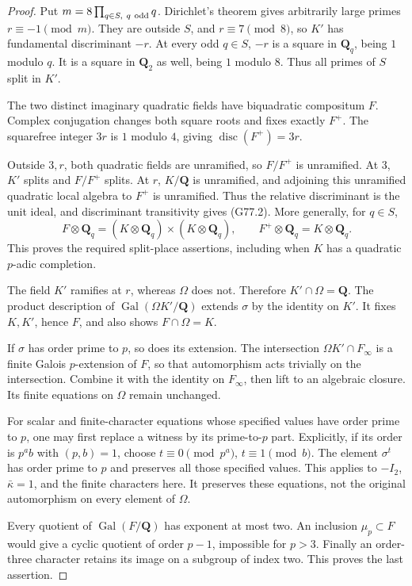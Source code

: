 \begin{proof}
Put \(m=8\prod_{q\in S,\ q\ {\rm odd}}q\). Dirichlet's theorem gives arbitrarily large primes \(r\equiv-1\pmod m\). They are outside \(S\), and \(r\equiv7\pmod8\), so \(K'\) has fundamental discriminant \(-r\). At every odd \(q\in S\), \(-r\) is a square in \(\mathbf Q_q\), being \(1\) modulo \(q\). It is a square in \(\mathbf Q_2\) as well, being \(1\) modulo \(8\). Thus all primes of \(S\) split in \(K'\).

The two distinct imaginary quadratic fields have biquadratic compositum \(F\). Complex conjugation changes both square roots and fixes exactly \(F^+\). The squarefree integer \(3r\) is \(1\) modulo \(4\), giving \(\operatorname{disc}(F^+)=3r\).

Outside \(3,r\), both quadratic fields are unramified, so \(F/F^+\) is unramified. At \(3\), \(K'\) splits and \(F/F^+\) splits. At \(r\), \(K/\mathbf Q\) is unramified, and adjoining this unramified quadratic local algebra to \(F^+\) is unramified. Thus the relative discriminant is the unit ideal, and discriminant transitivity gives (G77.2). More generally, for \(q\in S\),
\[
 F\otimes\mathbf Q_q=(K\otimes\mathbf Q_q)\times(K\otimes\mathbf Q_q),
 \qquad F^+\otimes\mathbf Q_q=K\otimes\mathbf Q_q.
 \tag{G77.3}
\]
This proves the required split-place assertions, including when \(K\) has a quadratic \(p\)-adic completion.

The field \(K'\) ramifies at \(r\), whereas \(\Omega\) does not. Therefore \(K'\cap\Omega=\mathbf Q\). The product description of
\(\operatorname{Gal}(\Omega K'/\mathbf Q)\) extends \(\sigma\) by the identity on \(K'\). It fixes \(K,K'\), hence \(F\), and also shows \(F\cap\Omega=K\).

If \(\sigma\) has order prime to \(p\), so does its extension. The intersection
\(\Omega K'\cap F_\infty\) is a finite Galois \(p\)-extension of \(F\), so that automorphism acts trivially on the intersection. Combine it with the identity on \(F_\infty\), then lift to an algebraic closure. Its finite equations on \(\Omega\) remain unchanged.

For scalar and finite-character equations whose specified values have order prime to \(p\), one may first replace a witness by its prime-to-\(p\) part. Explicitly, if its order is \(p^a b\) with \((p,b)=1\), choose \(t\equiv0\pmod{p^a}\), \(t\equiv1\pmod b\). The element \(\sigma^t\) has order prime to \(p\) and preserves all those specified values. This applies to \(-I_2\), \(\bar\kappa=1\), and the finite characters here. It preserves these equations, not the original automorphism on every element of \(\Omega\).

Every quotient of \(\operatorname{Gal}(F/\mathbf Q)\) has exponent at most two. An inclusion \(\mu_p\subset F\) would give a cyclic quotient of order \(p-1\), impossible for \(p>3\). Finally an order-three character retains its image on a subgroup of index two. This proves the last assertion.
\end{proof}

